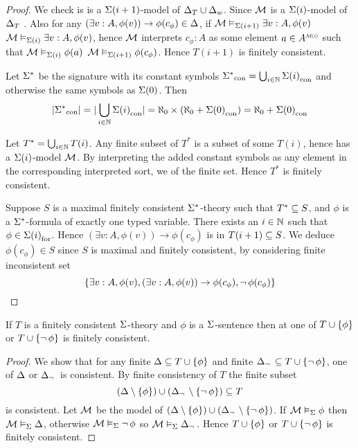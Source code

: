 \begin{proof}
    We check is is a $\Sigma(i+1)$-model of $\Delta_T \cup \Delta_w$.
    Since $\mathcal{M}$ is a $\Sigma(i)$-model
    of $\Delta_T$ .
    Also for any $(\exists v : A, \phi(v)) \to \phi(c_\phi) \in \Delta$, 
    if $\mathcal{M} \vDash_{\Sigma(i+1)} \exists v : A, \phi(v)$ 
     $\mathcal{M} \vDash_{\Sigma(i)} \exists v : A, \phi(v)$,
    hence $\mathcal{M}$ interprets $c_\phi : A$ as some element 
    $a \in \modintp{\MM(i)}{A}$ such that 
    $\mathcal{M} \vDash_{\Sigma(i)} \phi(a)$ 
    $\mathcal{M} \vDash_{\Sigma(i+1)} \phi(c_\phi)$. 
    Hence $T(i+1)$ is finitely consistent.

    Let $\Sigma^*$ be the signature with its constant symbols 
    ${\Sigma^*}_\mathrm{con} = \bigcup_{i \in \mathbb{N}} {\Sigma(i)}_\mathrm{con}$
    and otherwise the same symbols as $\Sigma(0)$.
    Then 
    \[
        |{\Sigma^*}_\mathrm{con}| = |\bigcup_{i \in \mathbb{N}} {\Sigma(i)}_\mathrm{con}| = 
        \aleph_0 \times (\aleph_0 + {\Sigma(0)}_\mathrm{con}) = 
        \aleph_0 + {\Sigma(0)}_\mathrm{con}
    \]

    Let $T^* = \bigcup_{i \in \mathbb{N}} T(i)$.
    Any finite subset of $T^*$ is a subset of some $T(i)$, 
    hence has a $\Sigma(i)$-model $\mathcal{M}$.
    By interpreting the added constant symbols as any
    element in the corresponding interpreted sort,
    we  of the finite set.
    Hence $T^*$ is finitely consistent.
    
    Suppose $S$ is a maximal finitely consistent 
    $\Sigma^*$-theory such that $T^* \subseteq S$,
    and $\phi$ is a $\Sigma^*$-formula of exactly one typed variable.
    There exists an $i \in \mathbb{N}$ such that $\phi \in {\Sigma(i)}_\mathrm{for}$.
    Hence $(\exists v : A, \phi(v)) \to \phi(c_\phi)$ is in $T(i+1) \subseteq S$.
    We deduce $\phi(c_\phi) \in S$ since $S$ is maximal and finitely consistent,
    by considering finite inconsistent set
    \[
        \left\{\exists v : A, \phi(v), 
        (\exists v : A, \phi(v)) \to \phi(c_\phi), 
        \neg\, \phi(c_\phi)\right\}
    \]
\end{proof}

\begin{lem}
    If $T$ is a finitely consistent $\Sigma$-theory 
    and $\phi$ is a $\Sigma$-sentence then at one of
    $T \cup \left\{\phi\right\}$ or $T \cup \left\{\neg\, \phi\right\}$ is finitely consistent.
\end{lem}
\begin{proof}
    We show that for any finite $\Delta \subseteq T \cup \left\{\phi\right\}$ and 
    finite $\Delta_\neg\, \subseteq T \cup \left\{\neg\, \phi\right\}$,
    one of $\Delta$ or $\Delta_\neg\,$ is consistent. 
    By finite consistency of $T$ the finite subset
    \[
        (\Delta \setminus \left\{\phi\right\}) \cup 
        (\Delta_\neg\, \setminus \left\{\neg\, \phi\right\}) \subseteq T
    \]
    is consistent.
    Let $\mathcal{M}$ be the model of 
    $(\Delta \setminus \left\{\phi\right\}) \cup 
    (\Delta_\neg\, \setminus \left\{\neg\, \phi\right\})$.
    If $\mathcal{M} \vDash_{\Sigma} \phi$ then $\mathcal{M} \vDash_{\Sigma} \Delta$,
    otherwise $\mathcal{M} \vDash_{\Sigma} \neg\, \phi$ so $\mathcal{M} \vDash_{\Sigma} \Delta_\neg\,$.
    Hence $T \cup \left\{\phi\right\}$ or $T \cup \left\{\neg\, \phi\right\}$ 
    is finitely consistent.
\end{proof}

